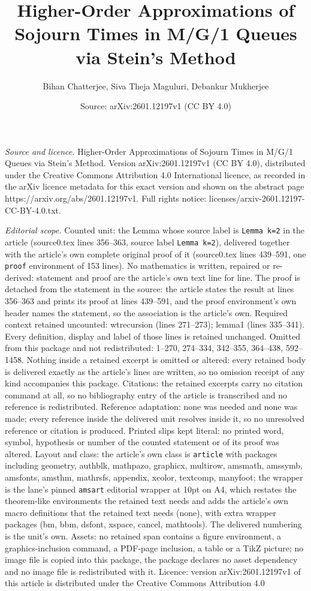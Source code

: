\documentclass[10pt,a4paper]{amsart}
\title[Higher-Order Approximations of Sojourn Times in M/G/1 Queues]{Higher-Order Approximations of Sojourn Times in M/G/1 Queues via Stein's Method}
\author{Bihan Chatterjee, Siva Theja Maguluri, Debankur Mukherjee}
\date{Source: arXiv:2601.12197v1 (CC BY 4.0)}
\begin{document}
\maketitle

\noindent\emph{Source and licence.} Higher-Order Approximations of Sojourn Times in M/G/1 Queues via Stein's Method. Version arXiv:2601.12197v1 (CC BY 4.0), distributed under the Creative Commons Attribution 4.0 International licence, as recorded in the arXiv licence metadata for this exact version and shown on the abstract page https://arxiv.org/abs/2601.12197v1. Full rights notice: licenses/arxiv-2601.12197-CC-BY-4.0.txt.\par\smallskip

\noindent\textit{Editorial scope.} Counted unit: the Lemma whose source label is \texttt{Lemma k=2} in the article (source0.tex lines 356--363, source label \texttt{Lemma k=2}), delivered together with the article's own complete original proof of it (source0.tex lines 439--591, one \texttt{proof} environment of 153 lines). No mathematics is written, repaired or re-derived: statement and proof are the article's own text line for line. The proof is detached from the statement in the source: the article states the result at lines 356--363 and prints its proof at lines 439--591, and the proof environment's own header names the statement, so the association is the article's own. Required context retained uncounted: wtrecursion (lines 271--273); lemma1 (lines 335--341). Every definition, display and label of those lines is retained unchanged. Omitted from this package and not redistributed: 1--270, 274--334, 342--355, 364--438, 592--1458. Nothing inside a retained excerpt is omitted or altered: every retained body is delivered exactly as the article's lines are written, so no omission receipt of any kind accompanies this package. Citations: the retained excerpts carry no citation command at all, so no bibliography entry of the article is transcribed and no reference is redistributed. Reference adaptation: none was needed and none was made; every reference inside the delivered unit resolves inside it, so no unresolved reference or citation is produced. Printed slips kept literal: no printed word, symbol, hypothesis or number of the counted statement or of its proof was altered. Layout and class: the article's own class is \texttt{article} with packages including geometry, authblk, mathpazo, graphicx, multirow, amsmath, amssymb, amsfonts, amsthm, mathrsfs, appendix, xcolor, textcomp, manyfoot; the wrapper is the lane's pinned \texttt{amsart} editorial wrapper at 10pt on A4, which restates the theorem-like environments the retained text needs and adds the article's own macro definitions that the retained text needs (none), with extra wrapper packages (bm, bbm, dsfont, xspace, cancel, mathtools). The delivered numbering is the unit's own. Assets: no retained span contains a figure environment, a graphics-inclusion command, a PDF-page inclusion, a table or a TikZ picture; no image file is copied into this package, the package declares no asset dependency and no image file is redistributed with it. Licence: version arXiv:2601.12197v1 of this article is distributed under the Creative Commons Attribution 4.0 
\end{document}
